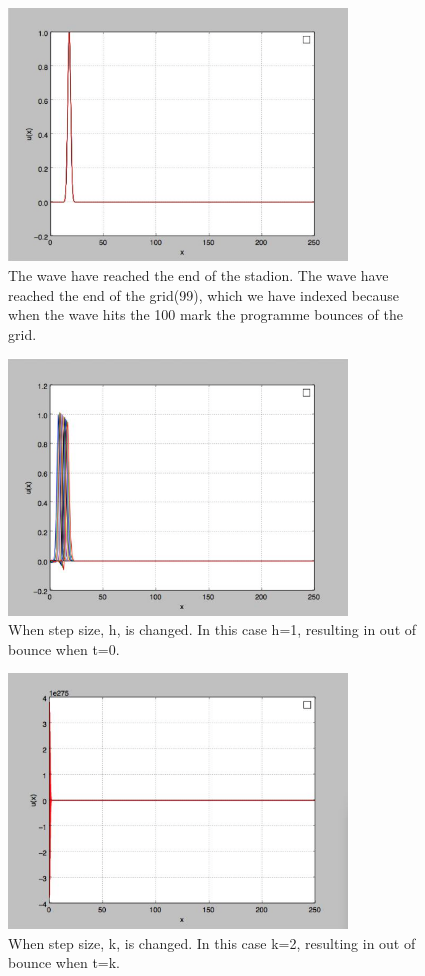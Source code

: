\documentclass[a4paper]{article}
\begin{document}
\begin{figure} [h]
\centering
\includegraphics[width=90mm]{5}
\caption{The wave have reached the end of the stadion. The wave have reached the end of the grid(99), which we have indexed because when the wave hits the 100 mark the programme bounces of the grid.}
\label{fig:5}
\end{figure}
\begin{figure} [h]
\centering
\includegraphics[width=90mm]{6}
\caption{When step size, h, is changed. In this case h=1, resulting in out of bounce when t=0.}
\label{fig:6}
\end{figure}
\begin{figure} [h]
\centering
\includegraphics[width=90mm]{7}
\caption{When step size, k, is changed. In this case k=2, resulting in out of bounce when t=k.}
\label{fig:7}
\end{figure}
\end{document}
